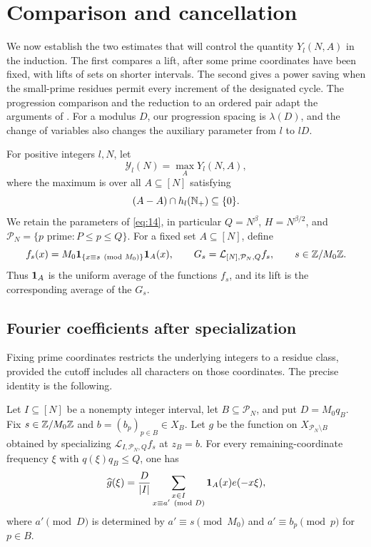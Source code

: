 \section{Comparison and cancellation}\label{sec:transfer}

We now establish the two estimates that will control the quantity
$Y_l(N,A)$ in the induction.  The first compares a lift, after some prime
coordinates have been fixed, with lifts of sets on shorter intervals.  The
second gives a power saving when the small-prime residues permit every
increment of the designated cycle.  The progression comparison and the
reduction to an ordered pair adapt the arguments of
\cite[Sections~7--8, especially Propositions~7.2 and~8.1]{squarepower}.
For a modulus $D$, our progression spacing is $\lambda(D)$, and the
change of variables also changes the auxiliary parameter from $l$ to $lD$.

For positive integers $l,N$, let
\[
 \mathcal Y_l(N)=\max_A Y_l(N,A),
\]
where the maximum is over all $A\subseteq[N]$ satisfying
\begin{equation}\label{eq:24}
 (A-A)\cap h_l(\mathbb N_+)\subseteq\{0\}.
\end{equation}
We retain the parameters of \eqref{eq:14}, in particular
$Q=N^\beta$, $H=N^{\beta/2}$, and
$\mathcal P_N=\{p\text{ prime}:P\le p\le Q\}$.
For a fixed set $A\subseteq[N]$, define
\[
 f_s(x)=M_0\mathbf 1_{\{x\equiv s\pmod{M_0}\}}\mathbf 1_A(x),
 \qquad
 G_s=\mathcal L_{[N],\mathcal P_N,Q}f_s,
 \qquad s\in\mathbb Z/M_0\mathbb Z.
\]
Thus $\mathbf 1_A$ is the uniform average of the functions $f_s$, and its lift
is the corresponding average of the $G_s$.

\subsection{Fourier coefficients after specialization}

Fixing prime coordinates restricts the underlying integers to a residue
class, provided the cutoff includes all characters on those coordinates.
The precise identity is the following.

\begin{lemma}\label{transfer:specialization}
Let $I\subseteq[N]$ be a nonempty integer interval, let
$B\subseteq\mathcal P_N$, and put $D=M_0q_B$.
Fix $s\in\mathbb Z/M_0\mathbb Z$ and $b=(b_p)_{p\in B}\in X_B$.
Let $g$ be the function on $X_{\mathcal P_N\setminus B}$ obtained by
specializing $\mathcal L_{I,\mathcal P_N,Q}f_s$ at $z_B=b$.
For every remaining-coordinate frequency $\xi$ with
$q(\xi)q_B\le Q$, one has
\begin{equation}\label{eq:25}
 \widehat g(\xi)
 =\frac{D}{|I|}
   \sum_{\substack{x\in I\\x\equiv a'\pmod D}}
       \mathbf 1_A(x)e(-x\xi),
\end{equation}
where $a'\pmod D$ is determined by
$a'\equiv s\pmod{M_0}$ and $a'\equiv b_p\pmod p$ for $p\in B$.
\end{lemma}

